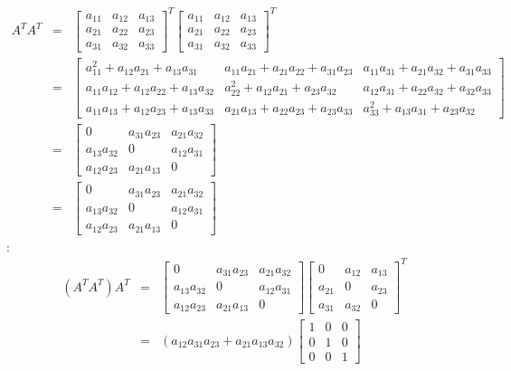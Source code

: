 \documentclass{article}
\begin{document}
\begin{eqnarray*}
A^{T}A^{T} &=&\left[ 
\begin{array}{ccc}
a_{11} & a_{12} & a_{13} \\ 
a_{21} & a_{22} & a_{23} \\ 
a_{31} & a_{32} & a_{33}%
\end{array}%
\right] ^{T}\left[ 
\begin{array}{ccc}
a_{11} & a_{12} & a_{13} \\ 
a_{21} & a_{22} & a_{23} \\ 
a_{31} & a_{32} & a_{33}%
\end{array}%
\right] ^{T} \\
&=&\left[ 
\begin{array}{ccc}
a_{11}^{2}+a_{12}a_{21}+a_{13}a_{31} & a_{11}a_{21}+a_{21}a_{22}+a_{31}a_{23}
& a_{11}a_{31}+a_{21}a_{32}+a_{31}a_{33} \\ 
a_{11}a_{12}+a_{12}a_{22}+a_{13}a_{32} & a_{22}^{2}+a_{12}a_{21}+a_{23}a_{32}
& a_{12}a_{31}+a_{22}a_{32}+a_{32}a_{33} \\ 
a_{11}a_{13}+a_{12}a_{23}+a_{13}a_{33} & 
a_{21}a_{13}+a_{22}a_{23}+a_{23}a_{33} & a_{33}^{2}+a_{13}a_{31}+a_{23}a_{32}%
\end{array}%
\right]  \\
&=&\left[ 
\begin{array}{ccc}
0 & a_{31}a_{23} & a_{21}a_{32} \\ 
a_{13}a_{32} & 0 & a_{12}a_{31} \\ 
a_{12}a_{23} & a_{21}a_{13} & 0%
\end{array}%
\right]  \\
&=&\left[ 
\begin{array}{ccc}
0 & a_{31}a_{23} & a_{21}a_{32} \\ 
a_{13}a_{32} & 0 & a_{12}a_{31} \\ 
a_{12}a_{23} & a_{21}a_{13} & 0%
\end{array}%
\right] 
\end{eqnarray*}%
: $\allowbreak $%
\begin{eqnarray*}
\left( A^{T}A^{T}\right) A^{T} &=&\left[ 
\begin{array}{ccc}
0 & a_{31}a_{23} & a_{21}a_{32} \\ 
a_{13}a_{32} & 0 & a_{12}a_{31} \\ 
a_{12}a_{23} & a_{21}a_{13} & 0%
\end{array}%
\right] \left[ 
\begin{array}{ccc}
0 & a_{12} & a_{13} \\ 
a_{21} & 0 & a_{23} \\ 
a_{31} & a_{32} & 0%
\end{array}%
\right] ^{T} \\
&=&\left( a_{12}a_{31}a_{23}+a_{21}a_{13}a_{32}\right) \left[ 
\begin{array}{ccc}
1 & 0 & 0 \\ 
0 & 1 & 0 \\ 
0 & 0 & 1%
\end{array}%
\right] 
\end{eqnarray*}%
\end{document}
